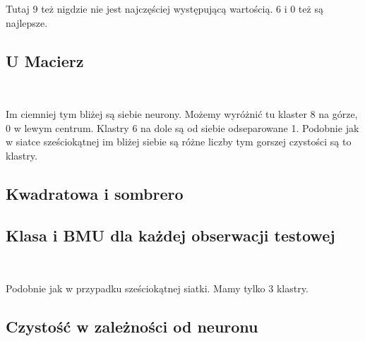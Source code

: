 \documentclass[11pt]{article}
\begin{document}
    Tutaj 9 też nigdzie nie jest najczęściej występującą wartością. 6 i 0
też są najlepsze.

    \hypertarget{u-macierz}{%
\subsection{U Macierz}\label{u-macierz}}

    \begin{center}
    \end{center}
    { \hspace*{\fill} \\}
    
    Im ciemniej tym bliżej są siebie neurony. Możemy wyróżnić tu klaster 8
na górze, 0 w lewym centrum. Klastry 6 na dole są od siebie odseparowane
1. Podobnie jak w siatce sześciokątnej im bliżej siebie są różne liczby
tym gorszej czystości są to klastry.

    \hypertarget{kwadratowa-i-sombrero}{%
\subsection{Kwadratowa i sombrero}\label{kwadratowa-i-sombrero}}

    \hypertarget{klasa-i-bmu-dla-kaux17cdej-obserwacji-testowej}{%
\subsection{Klasa i BMU dla każdej obserwacji
testowej}\label{klasa-i-bmu-dla-kaux17cdej-obserwacji-testowej}}

            
        
    \begin{center}
    \end{center}
    { \hspace*{\fill} \\}
    
    Podobnie jak w przypadku sześciokątnej siatki. Mamy tylko 3 klastry.

    \hypertarget{czystoux15bux107-w-zaleux17cnoux15bci-od-neuronu}{%
\subsection{Czystość w zależności od
neuronu}\label{czystoux15bux107-w-zaleux17cnoux15bci-od-neuronu}}
\end{document}
